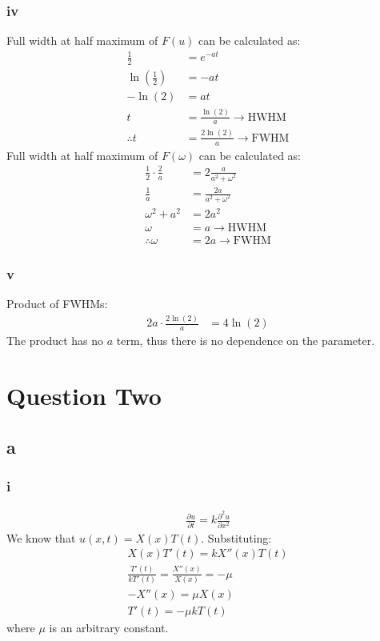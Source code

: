 \documentclass[11pt]{article}
\numberwithin{equation}{section}
\begin{document}
\subsubsection*{iv}
Full width at half maximum of $F\left(u\right)$ can be calculated as:
\begin{align}
	\frac{1}{2} &= e^{-at}\\
	\ln \left(\frac{1}{2}\right) &= -at\\
	-\ln \left(2\right) &= at\\
	t &= \frac{\ln \left( 2 \right)}{a} \rightarrow \textrm{HWHM}\\
	\therefore t &= \frac{2\ln \left( 2 \right)}{a} \rightarrow \textrm{FWHM}
\end{align}
Full width at half maximum of $F\left(\omega\right)$ can be calculated as:
\begin{align}
	\frac{1}{2}\cdot\frac{2}{a} &= 2\frac{a}{a^2 + \omega^2}\\
	\frac{1}{a} &= \frac{2a}{a^2 + \omega^2}\\
	\omega^2 + a^2 &= 2a^2\\
	\omega &= a \rightarrow \textrm{HWHM}\\
	\therefore \omega &= 2a \rightarrow \textrm{FWHM}
\end{align}
\subsubsection*{v}
Product of FWHMs:
\begin{align}
	2a\cdot \frac{2\ln\left(2\right)}{a} &= 4\ln\left(2\right)
\end{align}
The product has no $a$ term, thus there is no dependence on the parameter.
\section{Question Two}
\subsection*{a}
\subsubsection*{i}
\begin{align}
	\frac{\partial u}{\partial t} = k \frac{\partial^2 u}{\partial x^2}\label{PDEq2ai}
\end{align}
We know that $u(x,t) = X(x)T(t)$. Substituting:
\begin{gather}
	X\left(x\right) T'\left(t\right) = kX''\left(x\right)T\left(t\right)\\
	\frac{T'\left(t\right)}{kT'\left(t\right)} = \frac{X''\left(x\right)}{X\left(x\right)} = -\mu \\
	-X''\left(x\right) = \mu X\left(x\right)\\
	T'\left(t\right) = -\mu k T\left(t\right)
\end{gather}
where $\mu$ is an arbitrary constant. 
\end{document}
